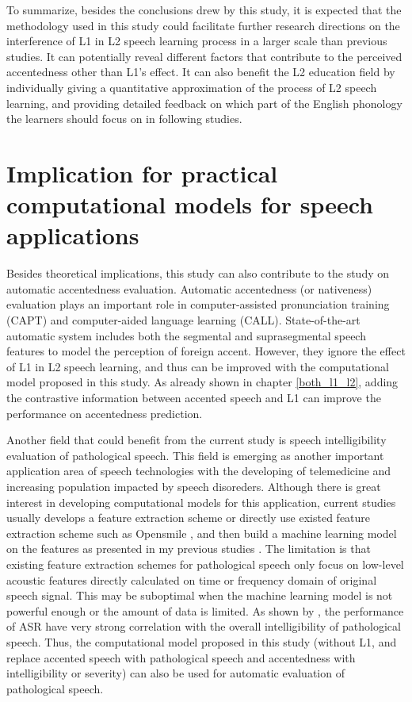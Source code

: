 To summarize, besides the conclusions drew by this study, it is expected that the methodology used in this study could facilitate further research directions on the interference of L1 in L2 speech learning process in a larger scale than previous studies. It can potentially reveal different factors that contribute to the perceived accentedness other than L1's effect. It can also benefit the L2 education field by individually giving a quantitative approximation of the process of L2 speech learning, and providing detailed feedback on which part of the English phonology the learners should focus on in following studies.

\section{Implication for practical computational models for speech applications}

Besides theoretical implications, this study can also contribute to the study on automatic accentedness evaluation. Automatic accentedness (or nativeness) evaluation plays an important role in computer-assisted pronunciation training (CAPT) and computer-aided language learning (CALL). State-of-the-art automatic system includes both the segmental and suprasegmental speech features to model the perception of foreign accent. However, they ignore the effect of L1 in L2 speech learning, and thus can be improved with the computational model proposed in this study. As already shown in chapter \ref{both_l1_l2}, adding the contrastive information between accented speech and L1 can improve the performance on accentedness prediction.

Another field that could benefit from the current study is speech intelligibility evaluation of pathological speech. This field is emerging as another important application area of speech technologies with the developing of telemedicine and increasing population impacted by speech disoreders. Although there is great interest in developing computational models for this application, current studies usually develops a feature extraction scheme or directly use existed feature extraction scheme such as Opensmile \citep{eyben2010opensmile}, and then build a machine learning model on the features as presented in my previous studies \citep{tu2016models,tu2017interpretable,tu2017objective}. The limitation is that existing feature extraction schemes for pathological speech only focus on low-level acoustic features directly calculated on time or frequency domain of original speech signal. This may be suboptimal when the machine learning model is not powerful enough or the amount of data is limited. As shown by \cite{tu2016relationship}, the performance of ASR have very strong correlation with the overall intelligibility of pathological speech. Thus, the computational model proposed in this study (without L1, and replace accented speech with pathological speech and accentedness with intelligibility or severity) can also be used for automatic evaluation of pathological speech.


